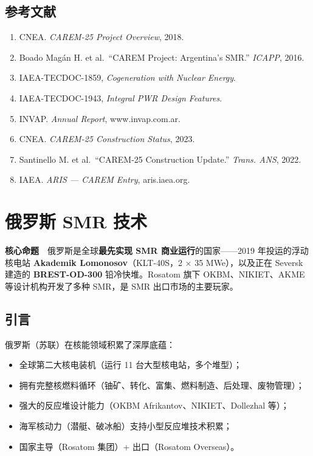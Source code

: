 \documentclass[
  UTF8,
  scheme=plain,
  fontsize=10pt,
  openany
]{ctexbook}
\begin{document}
\section{参考文献}\label{ux53c2ux8003ux6587ux732e-13}

\begin{enumerate}
\def\labelenumi{\arabic{enumi}.}
\tightlist
\item
  CNEA. \emph{CAREM-25 Project Overview}, 2018.
\item
  Boado Magán H. et al.~``CAREM Project: Argentina's SMR.''
  \emph{ICAPP}, 2016.
\item
  IAEA-TECDOC-1859, \emph{Cogeneration with Nuclear Energy}.
\item
  IAEA-TECDOC-1943, \emph{Integral PWR Design Features}.
\item
  INVAP. \emph{Annual Report}, www.invap.com.ar.
\item
  CNEA. \emph{CAREM-25 Construction Status}, 2023.
\item
  Santinello M. et al.~``CAREM-25 Construction Update.'' \emph{Trans.
  ANS}, 2022.
\item
  IAEA. \emph{ARIS --- CAREM Entry}, aris.iaea.org.
\end{enumerate}

\cleardoublepage

\chapter{俄罗斯 SMR 技术}\label{ux4fc4ux7f57ux65af-smr-ux6280ux672f}

\begin{epigraph}

\textbf{核心命题}　俄罗斯是全球\textbf{最先实现 SMR
商业运行}的国家------2019 年投运的浮动核电站 \textbf{Akademik
Lomonosov}（KLT-40S，2 × 35 MWe），以及正在 Seversk 建造的
\textbf{BREST-OD-300} 铅冷快堆。Rosatom 旗下 OKBM、NIKIET、AKME
等设计机构开发了多种 SMR，是 SMR 出口市场的主要玩家。

\end{epigraph}

\section{引言}\label{ux5f15ux8a00-16}

俄罗斯（苏联）在核能领域积累了深厚底蕴：

\begin{itemize}
\tightlist
\item
  全球第二大核电装机（运行 11 台大型核电站，多个堆型）；
\item
  拥有完整核燃料循环（铀矿、转化、富集、燃料制造、后处理、废物管理）；
\item
  强大的反应堆设计能力（OKBM Afrikantov、NIKIET、Dollezhal 等）；
\item
  海军核动力（潜艇、破冰船）支持小型反应堆技术积累；
\item
  国家主导（Rosatom 集团）+ 出口（Rosatom Overseas）。
\end{itemize}
\end{document}
